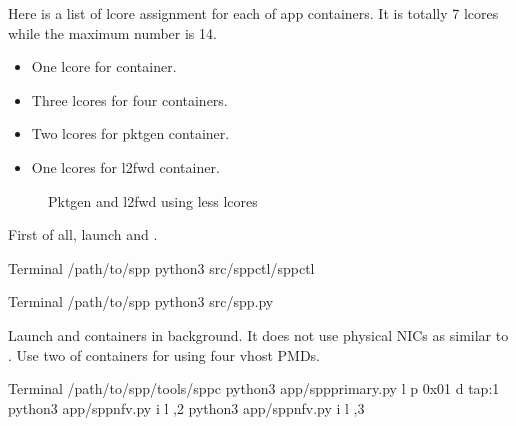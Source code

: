 \documentclass[a4paper,11pt,openany,oneside,english]{sphinxmanual}
\begin{document}
Here is a list of lcore assignment for each of app containers.
It is totally 7 lcores while the maximum number is 14.
\begin{itemize}
\item {} 
One lcore for  container.

\item {} 
Three lcores for four  containers.

\item {} 
Two lcores for pktgen container.

\item {} 
One lcores for l2fwd container.

\end{itemize}

\begin{figure}[htbp]
\centering
\capstart

\noindent{}
\caption{Pktgen and l2fwd using less lcores}\label{\detokenize{tools/sppc/usecases:id4}}\label{\detokenize{tools/sppc/usecases:figure-sppc-usecase-l2fwdpktgen-less}}\end{figure}

First of all, launch  and .

\begin{sphinxVerbatim}[commandchars=\\\{\},formatcom=\footnotesize]
 Terminal 
  /path/to/spp
 python3 src/spp\PYGZhy{}ctl/spp\PYGZhy{}ctl

 Terminal 
  /path/to/spp
 python3 src/spp.py
\end{sphinxVerbatim}

Launch  and  containers in background.
It does not use physical NICs as similar to
{\hyperref[\detokenize{tools/sppc/usecases:sppc-usecases-test-vhost-single}]{}}.
Use two of  containers for using four vhost PMDs.

\begin{sphinxVerbatim}[commandchars=\\\{\},formatcom=\footnotesize]
 Terminal 
  /path/to/spp/tools/sppc
 python3 app/spp\PYGZhy{}primary.py \PYGZhy{}l  \PYGZhy{}p 0x01 \PYGZhy{}d tap:1
 python3 app/spp\PYGZhy{}nfv.py \PYGZhy{}i  \PYGZhy{}l ,2
 python3 app/spp\PYGZhy{}nfv.py \PYGZhy{}i  \PYGZhy{}l ,3
\end{sphinxVerbatim}
\end{document}
